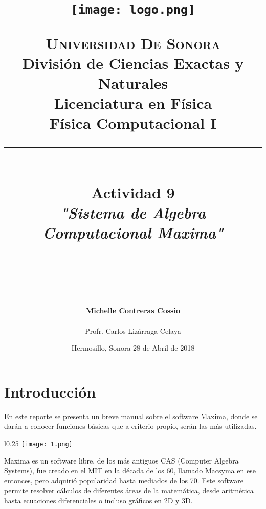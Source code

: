 \documentclass[12pt]{article}
\newcommand{\HRule}[1]{\rule{\linewidth}{#1}}
\begin{document}
\begin{titlepage}

\title{ \normalsize 
        \begin{center}
        \texttt{[image: logo.png]}
        \end{center}
        \LARGE \textsc{\textbf{Universidad De Sonora}} \\ \bigskip
		\Large División de Ciencias Exactas y Naturales \\
        Licenciatura en Física \\ \bigskip
        \bigskip
        Física Computacional I
		\\ [0.1cm]  
		\HRule{2pt} \\
		\Large \textbf{{Actividad 9}} \\
        \textit{\textbf{"Sistema de Algebra Computacional Maxima"}}
		\HRule{2pt} \\
		\normalsize \vspace*{0.001\baselineskip}}
        
\date{\bigskip \Large Hermosillo, Sonora  \hspace*{\fill}  28 de Abril de 2018}

        
\author{
		\Large\textbf{ Michelle Contreras Cossio} \\ \bigskip
        \\ \bigskip
       \Large Profr. Carlos Lizárraga Celaya}
       \end{titlepage}
       \maketitle
       

\newpage
\pagestyle{plain}

\section{Introducción}

En este reporte se presenta un breve manual sobre el software Maxima, donde se darán a conocer funciones básicas que a criterio propio, serán las más utilizadas.\\ 

\begin{wrapfigure} {l}{0.25\textwidth}
  \centering
  \texttt{[image: 1.png]}
\end{wrapfigure}

Maxima es un software libre, de los más antiguos CAS (Computer Algebra Systems), fue creado en el MIT en la década de los 60, llamado Macsyma en ese entonces, pero adquirió popularidad hasta mediados de los 70. Este software permite resolver cálculos de diferentes áreas de la matemática, desde aritmética hasta ecuaciones diferenciales o incluso gráficos en 2D y 3D.\\
\end{document}
